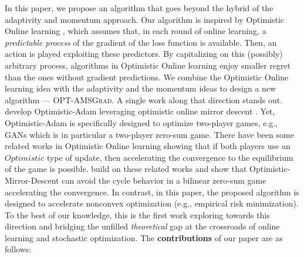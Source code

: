 \documentclass[wcp]{jmlr}
\begin{document}
In this paper, we propose an algorithm that goes beyond the hybrid of the adaptivity and momentum approach. 
Our algorithm is inspired by Optimistic Online learning \citep{CJ12,RS13b,SALS15,ALLW18,mertikopoulos2018optimistic}, which assumes that, in each round of online learning, a \emph{predictable process} of the gradient of the loss function is available. 
Then, an action is played exploiting these predictors. 
By capitalizing on this (possibly) arbitrary process, algorithms in Optimistic Online learning enjoy smaller regret than the ones without gradient predictions.
We combine the Optimistic Online learning idea with the adaptivity and the momentum ideas to design a new algorithm --- \textsc{OPT-AMSGrad}. 
A single work along that direction stands out. 
\cite{DISZ18} develop Optimistic-Adam leveraging optimistic online mirror descent \citep{RS13b}.
Yet, Optimistic-Adam is specifically designed to optimize two-player games, e.g., GANs \citep{goodfellow2014generative} which is in particular a two-player zero-sum game. 
There have been some related works in Optimistic Online learning \citep{CJ12,RS13b,SALS15} showing that if both players use an $\textit{Optimistic}$ type of update, then accelerating the convergence to the equilibrium of the game is possible.
\cite{DISZ18} build on these related works and show that Optimistic-Mirror-Descent can avoid the cycle behavior in a bilinear zero-sum game accelerating the convergence. 
In contrast, in this paper, the proposed algorithm is designed to accelerate nonconvex optimization (e.g., empirical risk minimization).
To the best of our knowledge, this is the first work exploring towards this direction and bridging the unfilled \emph{theoretical} gap at the crossroads of online learning and stochastic optimization.
The \textbf{contributions} of our paper are as follows:
\end{document}

